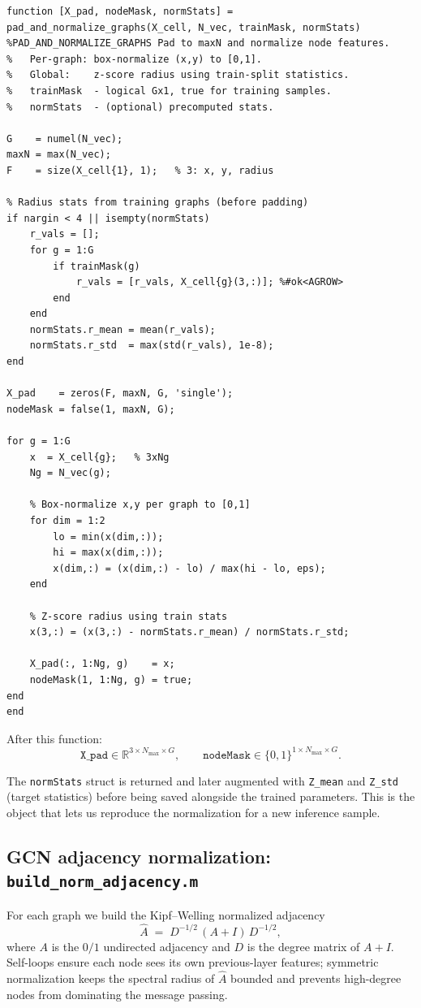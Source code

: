 \documentclass[11pt]{article}
\begin{document}
\begin{lstlisting}[caption={\texttt{helpers/pad\_and\_normalize\_graphs.m}}]
function [X_pad, nodeMask, normStats] = pad_and_normalize_graphs(X_cell, N_vec, trainMask, normStats)
%PAD_AND_NORMALIZE_GRAPHS Pad to maxN and normalize node features.
%   Per-graph: box-normalize (x,y) to [0,1].
%   Global:    z-score radius using train-split statistics.
%   trainMask  - logical Gx1, true for training samples.
%   normStats  - (optional) precomputed stats.

G    = numel(N_vec);
maxN = max(N_vec);
F    = size(X_cell{1}, 1);   % 3: x, y, radius

% Radius stats from training graphs (before padding)
if nargin < 4 || isempty(normStats)
    r_vals = [];
    for g = 1:G
        if trainMask(g)
            r_vals = [r_vals, X_cell{g}(3,:)]; %#ok<AGROW>
        end
    end
    normStats.r_mean = mean(r_vals);
    normStats.r_std  = max(std(r_vals), 1e-8);
end

X_pad    = zeros(F, maxN, G, 'single');
nodeMask = false(1, maxN, G);

for g = 1:G
    x  = X_cell{g};   % 3xNg
    Ng = N_vec(g);

    % Box-normalize x,y per graph to [0,1]
    for dim = 1:2
        lo = min(x(dim,:));
        hi = max(x(dim,:));
        x(dim,:) = (x(dim,:) - lo) / max(hi - lo, eps);
    end

    % Z-score radius using train stats
    x(3,:) = (x(3,:) - normStats.r_mean) / normStats.r_std;

    X_pad(:, 1:Ng, g)    = x;
    nodeMask(1, 1:Ng, g) = true;
end
end
\end{lstlisting}

After this function:
\[
  \texttt{X\_pad} \in \mathbb{R}^{3\times N_{\max}\times G}, \qquad
  \texttt{nodeMask} \in \{0,1\}^{1\times N_{\max}\times G}.
\]

The \texttt{normStats} struct is returned and later augmented with
\texttt{Z\_mean} and \texttt{Z\_std} (target statistics) before being saved
alongside the trained parameters. This is the object that lets us reproduce
the normalization for a new inference sample.

\subsection{GCN adjacency normalization: \texttt{build\_norm\_adjacency.m}}

For each graph we build the Kipf--Welling normalized adjacency
\[
  \hat A \;=\; D^{-1/2}\,(A + I)\,D^{-1/2},
\]
where $A$ is the $0/1$ undirected adjacency and $D$ is the degree matrix of
$A+I$. Self-loops ensure each node sees its own previous-layer features;
symmetric normalization keeps the spectral radius of $\hat A$ bounded and
prevents high-degree nodes from dominating the message passing.
\end{document}
